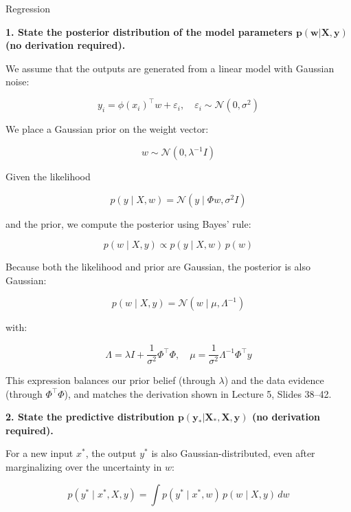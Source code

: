\documentclass[
	english,
        solution=true
	]{tudaexercise}
\begin{document}
\begin{task}[points=34]{Regression}
\begin{subtask}[points=10, title=Bayesian Linear Regression]
        \begin{solution}
            \textbf{1. State the posterior distribution of the model parameters $\bm{p(w | X, y)}$ (no derivation required).}

            We assume that the outputs are generated from a linear model with Gaussian noise:
            
            \[
            y_i = \phi(x_i)^\top w + \varepsilon_i, \quad \varepsilon_i \sim \mathcal{N}(0, \sigma^2)
            \]

            We place a Gaussian prior on the weight vector:

            \[
            w \sim \mathcal{N}(0, \lambda^{-1} I)
            \]

            Given the likelihood
            
            \[
            p(y \mid X, w) = \mathcal{N}(y \mid \Phi w, \sigma^2 I)
            \]
            
            and the prior, we compute the posterior using Bayes' rule:
            
            \[
            p(w \mid X, y) \propto p(y \mid X, w)\, p(w)
            \]

            Because both the likelihood and prior are Gaussian, the posterior is also Gaussian:
            
            \[
            p(w \mid X, y) = \mathcal{N}(w \mid \mu, \Lambda^{-1})
            \]

            with:
            
            \[
            \Lambda = \lambda I + \frac{1}{\sigma^2} \Phi^\top \Phi, \quad
            \mu = \frac{1}{\sigma^2} \Lambda^{-1} \Phi^\top y
            \]

            This expression balances our prior belief (through $\lambda$) and the data evidence (through $\Phi^\top \Phi$), and matches the derivation shown in Lecture 5, Slides 38–42.

            \vspace{2em}

            \textbf{2. State the predictive distribution $\bm{p(y_* | X_*, X, y)}$ (no derivation required).}

            For a new input $x^*$, the output $y^*$ is also Gaussian-distributed, even after marginalizing over the uncertainty in $w$:
            
            \[
            p(y^* \mid x^*, X, y) = \int p(y^* \mid x^*, w)\, p(w \mid X, y)\, dw
            \]


\end{solution}
\end{subtask}
\end{task}
\end{document}
